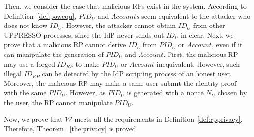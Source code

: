 Then, we consider the case that malicious RPs exist in the system. %
According to Definition~\ref{def:powequ}, $PID_U$ and $Accounts$ seem equivalent to the attacker who does not know $ID_U$. However, the attacker cannot obtain $ID_U$ from other UPPRESSO processes, since the IdP never sends out $ID_U$ in clear. Next, we prove that a malicious RP cannot derive $ID_U$ from $PID_U$ or $Account$, even if it can manipulate the generation of $PID_U$ and $Account$. First, the malicious RP may use a forged $ID_{RP}$ to make $PID_U$ or $Account$ inequivalent. However, such illegal $ID_{RP}$ can be detected by the IdP scripting process of an honest user. Moreover, the malicious RP may make a same user submit the identity proof with the same $PID_U$. However, as $PID_U$ is generated with a nonce $N_U$ chosen by the user, the RP cannot manipulate $PID_U$.
\begin{comment}
\vspace{-\topsep}
\begin{itemize}
\setlength{\itemsep}{0pt plus 1pt}
\item RP may lead the login using the forged  so that $PID_U$s and $Accounts$ are no more equivalent. However, $ID_{RP}$ are provided by the $Cert$ which is verified at algorithm~\ref{alg3} line 17, by the IdP's public key set initially and not modified.  $PID_{RP}$ is generated by the $ID_{RP}$ at line 21 using the honest user generated nonce at line 20. Therefore, it is impossible to lead the honest user to use the illegal $ID_{RP}$ and $PID_{RP}$.
\item RP may also lead the same user to upload the identity proof with same $PID_U$ or $Account$ so that the system is not RP-Privacy according to requirement~\ref{req:rp}. However, the $PID_U$ is generated containing the user's generated nonce $N_U$ so that it is not controlled by the RP. $Account$ is generated as the form $ID_{RP}^{ID_U} \mod p$, while RPs may lead the user to use the same $ID_{RP}$ to generate identity proof. However, the $ID_{RP}$ is bound with $Cert$ which is verified by the user and it is easy for user to find out the login RP  does not coincide the RP name shown on her browser.
\end{itemize}
\end{comment}
Now, we prove that $\mathcal{W}$ meets all the requirements in Definition~\ref{def:rpprivacy}. Therefore, Theorem ~\ref{the:privacy} is proved.





